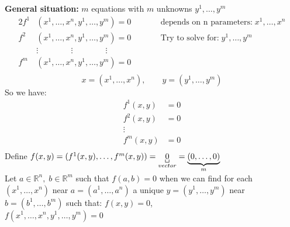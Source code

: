 \documentclass[11pt]{article}
\def\RR{\mathbb{R}}
\begin{document}
\textbf{General situation:} $m$ equations with $ m$ unknowns $y^1, \dots , y^m$
\begin{alignat*}{2}
f^1 &(x^1 , \dots , x^n , y^1 , \dots , y^m) = 0 &\qquad & \text{depends on n parameters:}\; x^1 , \dots , x^n\\
f^2 &(x^1 , \dots , x^n , y^1 , \dots , y^m)= 0 &\qquad & \text{Try to solve for:} \;  y^1 , \dots , y^m\\
&\vdots \qquad \qquad \vdots \qquad \qquad \vdots 			&\quad & \\
f^m &(x^1 , \dots , x^n , y^1 , \dots , y^m)= 0 &\quad &\\
\end{alignat*}
\[ x=(x^1 , \dots , x^n) , \qquad y=(y^1 , \dots , y^m)\]
So we have:
\begin{align*}
f^1(x,y) &=0\\
f^2(x,y) &=0\\
\vdots\\
f^m(x,y) &=0\\
\end{align*}
Define $f(x,y) = (f^1(x,y), \dots , f^m (x,y))=\underbracket[0.5pt]{0}_{vector} =\underbrace{(0,\dots,0)}_{
          \mathclap{m}}$\\
Let $a \in \RR^n , \; b \in \RR^m$ such that $f(a,b) = 0$ when we can find for each $(x^1,  \dots, x^n) $  near $a=(a^1 , \dots , a^n )$ a unique $y=(y^1 , \dots , y^m )$ near $b= (b^1 , \dots , b^m)$ such that: $f(x,y)=0$, \\$f(x^1 , \dots , x^n , y^1 , \dots , y^m) = 0$
\end{document}
